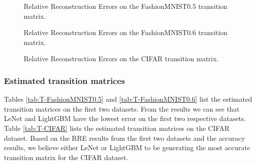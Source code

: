 \documentclass{article} %
\begin{document}
\begin{figure}\caption{
  Relative Reconstruction Errors on the FashionMNIST0.5 transition matrix.
  \label{fig:T-hat-RRE-FashionMNIST0.5}
}\end{figure}

\begin{figure}\caption{
  Relative Reconstruction Errors on the FashionMNIST0.6 transition matrix.
  \label{fig:T-hat-RRE-FashionMNIST0.6}
}\end{figure}

\begin{figure}\caption{
  Relative Reconstruction Errors on the CIFAR transition matrix.
  \label{fig:T-hat-RRE-CIFAR}
}\end{figure}

\subsubsection{Estimated transition matrices}
Tables \ref{tab:T-FashionMNIST0.5} and \ref{tab:T-FashionMNIST0.6} list the estimated transition matrices on the first two datasets. From the results we can see that LeNet and LightGBM have the lowest error on the first two respective datasets. Table \ref{tab:T-CIFAR} lists the estimated transition matrices on the CIFAR dataset. Based on the RRE results from the first two datasets and the accuracy results, we believe either LeNet or LightGBM to be generating the most accurate transition matrix for the CIFAR dataset.
\end{document}
